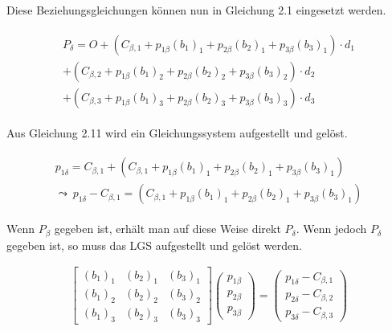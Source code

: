 	Diese Beziehungsgleichungen können nun in Gleichung 2.1 eingesetzt werden.
	
	\begin{gather}
	\begin{split}
	P_\delta = O + (C_{\beta,1} + p_{1\beta}(b_1)_1 +  p_{2\beta}(b_2)_1 + p_{3\beta}(b_3)_1) \cdot d_1\\
	+(C_{\beta,2} + p_{1\beta}(b_1)_2 +  p_{2\beta}(b_2)_2 + p_{3\beta}(b_3)_2) \cdot d_2\\
	+ (C_{\beta,3} + p_{1\beta}(b_1)_3 +  p_{2\beta}(b_2)_3 + p_{3\beta}(b_3)_3) \cdot d_3
	\end{split}
	\end{gather}
	
Aus Gleichung 2.11 wird ein Gleichungssystem aufgestellt und gelöst.
	
	\begin{gather}
	\begin{split}
	p_{1\delta} = C_{\beta,1} + (C_{\beta,1} + p_{1\beta}(b_1)_1 +  p_{2\beta}(b_2)_1 + p_{3\beta}(b_3)_1) \\
	\leadsto \: p_{1\delta} - C_{\beta,1} =  (C_{\beta,1} + p_{1\beta}(b_1)_1 +  p_{2\beta}(b_2)_1 + p_{3\beta}(b_3)_1)
	\end{split}
	\end{gather}
	
Wenn $P_\beta$ gegeben ist, erhält man auf diese Weise direkt $P_\delta$. Wenn jedoch  $P_\delta$  gegeben ist, so muss das LGS aufgestellt und gelöst werden.
	
	\begin{gather}
	\begin{bmatrix}(b_1)_1 & (b_2)_1 & (b_3)_1\\
	(b_1)_2 & (b_2)_2 & (b_3)_2\\
	(b_1)_3 & (b_2)_3 & (b_3)_3
	\end{bmatrix} 
	\begin{pmatrix}
	p_{1\beta}\\p_{2\beta}\\ p_{3\beta}
	\end{pmatrix} = 
	\begin{pmatrix}
	p_{1\delta} - C_{\beta,1}\\
	p_{2\delta} - C_{\beta,2}\\
	p_{3\delta} - C_{\beta,3}
	\end{pmatrix}
	\end{gather}
	
